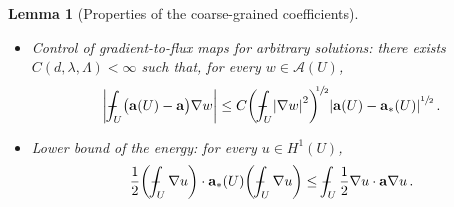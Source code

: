 \documentclass[11pt]{article} %
\numberwithin{equation}{section}
\newtheorem{lemma}[theorem]{Lemma}
\theoremstyle{definition}
\let\originalleft\left
\let\originalright\right
\renewcommand{\left}{\mathopen{}\mathclose\bgroup\originalleft}
\renewcommand{\right}{\aftergroup\egroup\originalright}
\renewcommand{\a}{\mathbf{a}}
\def\Xint#1{\mathchoice
{\XXint\displaystyle\textstyle{#1}}%
{\XXint\textstyle\scriptstyle{#1}}%
{\XXint\scriptstyle\scriptscriptstyle{#1}}%
{\XXint\scriptscriptstyle\scriptscriptstyle{#1}}%
\!\int}
\def\XXint#1#2#3{{\setbox0=\hbox{$#1{#2#3}{\int}$}
\vcenter{\hbox{$#2#3$}}\kern-.5\wd0}}
\def\fint{\Xint-}
\newcommand{\A}{\mathcal{A}}
\begin{document}
\begin{lemma}[Properties of the coarse-grained coefficients]
\begin{itemize}
\item Control of gradient-to-flux maps for arbitrary solutions: there exists $C(d,\lambda,\Lambda)<\infty$ such that, for every $w\in \A(U)$,
\begin{align}
\label{e.fluxmaps}
\left| 
\fint_U \bigl( \a(U) - \a \bigr) \nabla w
\right| 
\leq 
C \left( \fint_U \left| \nabla w\right|^2 \right)^{\!\!\sfrac12} 
\left| \a(U) - \a_*(U) \right|^{\sfrac12} 
\,.
\end{align}

\item Lower bound of the energy: for every $u\in H^1(U)$, 
\begin{align}
\label{e.energymaps}
\frac12\left( \fint_U \nabla u \right) \cdot \a_*(U) \left( \fint_U \nabla u \right)
\leq
\fint_U \frac12 \nabla u \cdot \a\nabla u 
\,.
\end{align}

\end{itemize}
\end{lemma}
\end{document}
